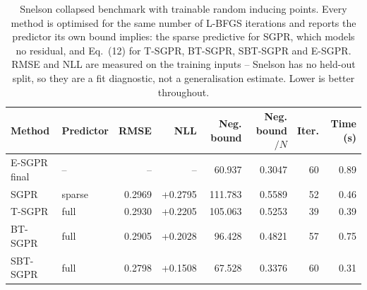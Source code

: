 \begin{table}[t]
\centering
\caption{Snelson collapsed benchmark with trainable random inducing points. Every method is optimised for the same number of L-BFGS iterations and reports the predictor its own bound implies: the sparse predictive for SGPR, which models no residual, and Eq.~(12) for T-SGPR, BT-SGPR, SBT-SGPR and E-SGPR. RMSE and NLL are measured on the training inputs -- Snelson has no held-out split, so they are a fit diagnostic, not a generalisation estimate. Lower is better throughout.}
\label{tab:snelson-sgpr-t-bt-sbt}
\begin{tabular}{llrrrrrr}
\toprule
Method & Predictor & RMSE & NLL & Neg. bound & Neg. bound$/N$ & Iter. & Time (s) \\
\midrule
E-SGPR final & -- & -- & -- & 60.937 & 0.3047 & 60 & 0.89 \\
SGPR & sparse & 0.2969 & +0.2795 & 111.783 & 0.5589 & 52 & 0.46 \\
T-SGPR & full & 0.2930 & +0.2205 & 105.063 & 0.5253 & 39 & 0.39 \\
BT-SGPR & full & 0.2905 & +0.2028 & 96.428 & 0.4821 & 57 & 0.75 \\
SBT-SGPR & full & 0.2798 & +0.1508 & 67.528 & 0.3376 & 60 & 0.31 \\
\bottomrule
\end{tabular}
\end{table}
